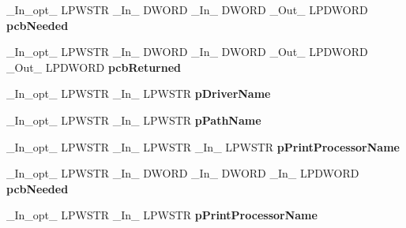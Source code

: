 \begin{DoxyCompactItemize}
\item 
\mbox{\label{struct___p_r_i_n_t_p_r_o_v_i_d_o_r_aedfde952f34cd96168aa394ea81e195e}} 
\+\_\+\+In\+\_\+opt\+\_\+ L\+P\+W\+S\+TR \+\_\+\+In\+\_\+ D\+W\+O\+RD \+\_\+\+In\+\_\+ D\+W\+O\+RD \+\_\+\+Out\+\_\+ L\+P\+D\+W\+O\+RD {\bfseries pcb\+Needed}
\item 
\mbox{\label{struct___p_r_i_n_t_p_r_o_v_i_d_o_r_a54c91cecc00c42f4254323cfeee608bc}} 
\+\_\+\+In\+\_\+opt\+\_\+ L\+P\+W\+S\+TR \+\_\+\+In\+\_\+ D\+W\+O\+RD \+\_\+\+In\+\_\+ D\+W\+O\+RD \+\_\+\+Out\+\_\+ L\+P\+D\+W\+O\+RD \+\_\+\+Out\+\_\+ L\+P\+D\+W\+O\+RD {\bfseries pcb\+Returned}
\item 
\mbox{\label{struct___p_r_i_n_t_p_r_o_v_i_d_o_r_a053773b40267559a991e9d213ba01a75}} 
\+\_\+\+In\+\_\+opt\+\_\+ L\+P\+W\+S\+TR \+\_\+\+In\+\_\+ L\+P\+W\+S\+TR {\bfseries p\+Driver\+Name}
\item 
\mbox{\label{struct___p_r_i_n_t_p_r_o_v_i_d_o_r_a11a0541f8e8ff6bb74f36fa5f499a1cf}} 
\+\_\+\+In\+\_\+opt\+\_\+ L\+P\+W\+S\+TR \+\_\+\+In\+\_\+ L\+P\+W\+S\+TR {\bfseries p\+Path\+Name}
\item 
\mbox{\label{struct___p_r_i_n_t_p_r_o_v_i_d_o_r_a3d70daadbda6d2e2c20911cd0f326891}} 
\+\_\+\+In\+\_\+opt\+\_\+ L\+P\+W\+S\+TR \+\_\+\+In\+\_\+ L\+P\+W\+S\+TR \+\_\+\+In\+\_\+ L\+P\+W\+S\+TR {\bfseries p\+Print\+Processor\+Name}
\item 
\mbox{\label{struct___p_r_i_n_t_p_r_o_v_i_d_o_r_a76c2df5593a838487fe3256fc7e437bc}} 
\+\_\+\+In\+\_\+opt\+\_\+ L\+P\+W\+S\+TR \+\_\+\+In\+\_\+ D\+W\+O\+RD \+\_\+\+In\+\_\+ D\+W\+O\+RD \+\_\+\+In\+\_\+ L\+P\+D\+W\+O\+RD {\bfseries pcb\+Needed}
\item 
\mbox{\label{struct___p_r_i_n_t_p_r_o_v_i_d_o_r_aa209669eb21b41e54620e5f558515308}} 
\+\_\+\+In\+\_\+opt\+\_\+ L\+P\+W\+S\+TR \+\_\+\+In\+\_\+ L\+P\+W\+S\+TR {\bfseries p\+Print\+Processor\+Name}
\item 
\mbox{\label{struct___p_r_i_n_t_p_r_o_v_i_d_o_r_a11197c3258d4970f51ed7e74ad2a5b90}} 

\end{DoxyCompactItemize}
